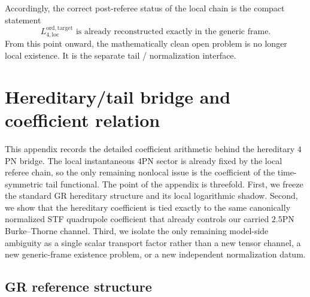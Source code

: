 \documentclass[11pt]{article}
\begin{document}
Accordingly, the correct post-referee status of the local chain is the compact
statement
\begin{equation}
\boxed{
L_{4,\mathrm{loc}}^{\mathrm{ord,target}}
\text{ is already reconstructed exactly in the generic frame.}}
\label{eq:app-local-referee-final-status}
\end{equation}
From this point onward, the mathematically clean open problem is no longer local
existence.  It is the separate tail / normalization interface.


\section{Hereditary/tail bridge and coefficient relation}
\label{app:tail-hereditary-bridge-coefficient}

This appendix records the detailed coefficient arithmetic behind the hereditary
$4$PN bridge.  The local instantaneous $4$PN sector is already fixed by the
local referee chain, so the only remaining nonlocal issue is the coefficient of
the time-symmetric tail functional.  The point of the appendix is threefold.
First, we freeze the standard GR hereditary structure and its local logarithmic
shadow.  Second, we show that the hereditary coefficient is tied exactly to the
same canonically normalized STF quadrupole coefficient that already controls
our carried $2.5$PN Burke--Thorne channel.  Third, we isolate the only
remaining model-side ambiguity as a single scalar transport factor rather than a
new tensor channel, a new generic-frame existence problem, or a new independent
normalization datum.

\subsection{GR reference structure}
\label{app:tail-gr-reference-structure}
\end{document}
